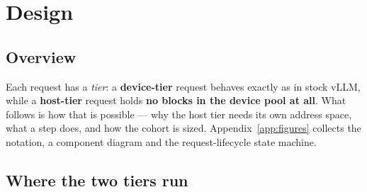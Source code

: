 %
%

\section{Design}
\label{sec:design}

\subsection{Overview}
\label{sec:design:overview}

Each request has a \emph{tier}: a \textbf{device-tier} request behaves exactly as
in stock vLLM, while a \textbf{host-tier} request holds \textbf{no blocks in the
device pool at all}. What follows is how that is possible --- why the host tier
needs its own address space, what a step does, and how the cohort is sized.
Appendix~\ref{app:figures} collects the notation, a component diagram and the
request-lifecycle state machine.

\subsection{Where the two tiers run}
\label{sec:design:exec}

